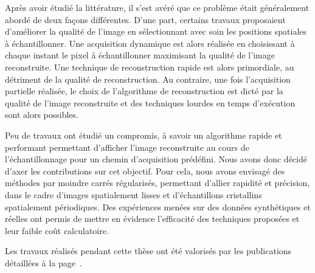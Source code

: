 Après avoir étudié la littérature, il s'est avéré que ce problème était généralement abordé de deux façons différentes. D'une part, certains travaux proposaient d'améliorer la qualité de l'image en sélectionnant avec soin les positions spatiales à échantillonner. Une acquisition dynamique est alors réalisée en choisissant à chaque instant le pixel à échantillonner maximisant la qualité de l'image reconstruite. Une technique de reconstruction rapide est alors primordiale, au détriment de la qualité de reconstruction. Au contraire, une fois l'acquisition partielle réalisée, le choix de l'algorithme de reconstruction est dicté par la qualité de l'image reconstruite et des techniques lourdes en temps d'exécution sont alors possibles. 

Peu de travaux ont étudié un compromis, à savoir un algorithme rapide et performant permettant d'afficher l'image reconstruite au cours de l'échantillonnage pour un chemin d'acquisition prédéfini.  Nous avons donc décidé d'axer les contributions sur cet objectif. Pour cela, nous avons envisagé des méthodes par moindre carrés régularisés, permettant d'allier rapidité et précision, dans le cadre d'images spatialement lisses et d'échantillons cristallins spatialement périodiques. Des expériences menées sur des données synthétiques et réelles ont permis de mettre en évidence l'efficacité des techniques proposées et leur faible coût calculatoire. 

Les travaux réalisés pendant cette thèse ont été valorisés par les publications détaillées à la page~\pageref{ch-liste-publis}.


 
 
